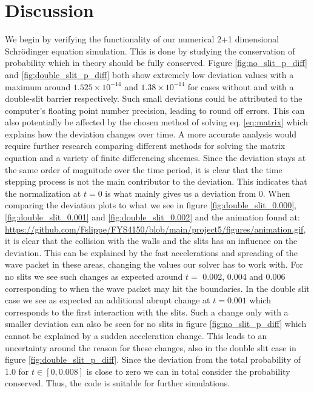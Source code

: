 \documentclass[english,notitlepage,reprint,nofootinbib]{revtex4-1}  %
\begin{document}
\section{Discussion}\label{sec:discussion}
We begin by verifying the functionality of our numerical 2+1 dimensional Schrödinger equation simulation. This is done by studying the conservation of probability which in theory should be fully conserved. Figure \ref{fig:no_slit_p_diff} and \ref{fig:double_slit_p_diff} both show extremely low deviation values with a maximum around $1.525 \times 10^{-14}$ and $1.38 \times 10^{-14}$ for cases without and with a double-slit barrier respectively. Such small deviations could be attributed to the computer's floating point number precision, leading to round off errors.  This can also potentially be affected by the chosen method of solving eq. \ref{eq:matrix} which explains how the deviation changes over time. A more accurate analysis would require further research comparing different methods for solving the matrix equation and a variety of finite differencing shcemes.
Since the deviation stays at the same order of magnitude over the time period, it is clear that the time stepping process is not the main contributor to the deviation. This indicates that the normalization at $t=0$ is what mainly gives us a deviation from 0. When comparing the deviation plots to what we see in figure \ref{fig:double_slit_0.000}, \ref{fig:double_slit_0.001} and \ref{fig:double_slit_0.002} and the animation found at: \url{https://github.com/Fslippe/FYS4150/blob/main/project5/figures/animation.gif}, it is clear that the collision with the walls and the slits has an influence on the deviation. This can be explained by the fast accelerations and spreading of the wave packet in these areas, changing the values our solver has to work with. For no slits we see such changes as expected around $t=$ 0.002, 0.004 and 0.006 corresponding to when the wave packet may hit the boundaries. In the double slit case we see as expected an additional abrupt change at $t=0.001$ which corresponds to the first interaction with the slits. Such a change only with a smaller deviation can also be seen for no slits in figure \ref{fig:no_slit_p_diff} which cannot be explained by a sudden acceleration change. This leads to an uncertainty around the reason for these changes, also in the double slit case in figure \ref{fig:double_slit_p_diff}. Since the deviation from the total probability of $1.0$ for $t \in [0,0.008]$ is close to zero we can in total consider the probability conserved. Thus, the code is suitable for further simulations.
\end{document}
